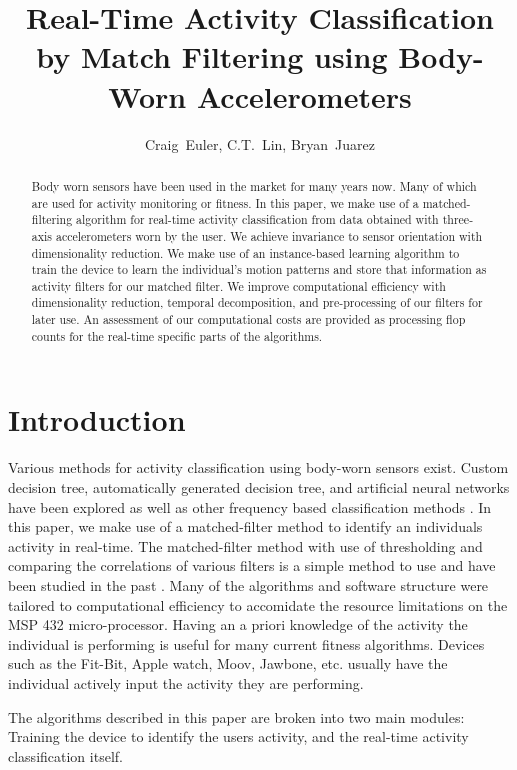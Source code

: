 \documentclass[journal]{IEEEtran}
\begin{document}
%
\title{Real-Time Activity Classification by Match Filtering using Body-Worn Accelerometers}
%
\author{Craig~Euler, C.T.~Lin, Bryan~Juarez}
%
\maketitle
%
\begin{abstract}
Body worn sensors have been used in the market for many years now.
Many of which are used for activity monitoring or fitness.
In this paper, we make use of a matched-filtering algorithm for real-time activity classification from data obtained with three-axis accelerometers worn by the user.
We achieve invariance to sensor orientation with dimensionality reduction.
We make use of an instance-based learning algorithm to train the device to learn the individual's motion patterns and store that information as activity filters for our matched filter.
We improve computational efficiency with dimensionality reduction, temporal decomposition, and pre-processing of our filters for later use.
An assessment of our computational costs are provided as processing flop counts for the real-time specific parts of the algorithms.
\end{abstract}
%
\section{Introduction}
Various methods for activity classification using body-worn sensors exist.
Custom decision tree, automatically generated decision tree, and artificial neural networks \cite{parkka_ermes_korpipaa_mantyjarvi_peltola_korhonen_2006} have been explored as well as other frequency based classification methods \cite{sharma_purwar_lee_lee_chung_2008}.
In this paper, we make use of a matched-filter method to identify an individual\textquotesingle s activity in real-time.
The matched-filter method with use of thresholding and comparing the correlations of various filters is a simple method to use and have been studied in the past \cite{giannakis_tsatsanis_1990}.
Many of the algorithms and software structure were tailored to computational efficiency to accomidate the resource limitations on the MSP 432 micro-processor.
Having an a priori knowledge of the activity the individual is performing is useful for many current fitness algorithms.
Devices such as the Fit-Bit, Apple watch, Moov, Jawbone, etc. usually have the individual actively input the activity they are performing.

The algorithms described in this paper are broken into two main modules: Training the device to identify the user\textquotesingle s activity, and the real-time activity classification itself.
\end{document}
